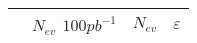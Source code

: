 \documentclass[colclass=cmspaper]{combine}
\begin{document}
\begin{linenumbers}



\begin{table}[htbp]
\begin{center}
\begin{tabular}{|c|c|c|c|}
\hline
\hline
 & $N_{ev}$ $100pb^{-1}$ & $N_{ev}$ & $\varepsilon$ \\
\hline
\hline


\end{tabular}
\end{center}
\end{table}
\end{linenumbers}
\end{document}

